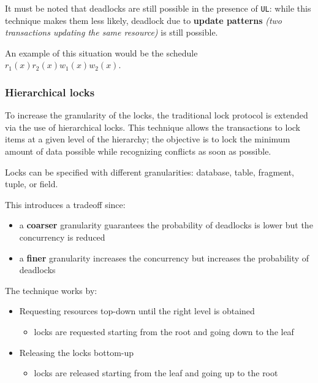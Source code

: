 \documentclass[english]{article}
\begin{document}
\bigskip
It must be noted that deadlocks are still possible in the presence of \texttt{UL}:
while this technique makes them less likely, deadlock due to \textbf{update patterns} \textit{(two transactions updating the same resource)} is still possible.

An example of this situation would be the schedule \(r_1(x) r_2(x) w_1(x) w_2(x)\).

\subsubsection{Hierarchical locks}

To increase the granularity of the locks, the traditional lock protocol is extended via the use of hierarchical locks.
This technique allows the transactions to lock items at a given level of the hierarchy;
the objective is to lock the minimum amount of data possible while recognizing conflicts as soon as possible.

\begin{minipage}{0.8\textwidth}
  \bigskip
  Locks can be specified with different granularities: database, table, fragment, tuple, or field.

  This introduces a tradeoff since:
  \begin{itemize}
    \item a \textbf{coarser} granularity guarantees the probability of deadlocks is lower but the concurrency is reduced
    \item a \textbf{finer} granularity increases the concurrency but increases the probability of deadlocks
  \end{itemize}
  \bigskip
\end{minipage}
\begin{minipage}{0.195\textwidth}
  \bigskip
  \centering
  \bigskip
\end{minipage}

\bigskip
The technique works by:

\begin{itemize}
  \item Requesting resources top-down until the right level is obtained
        \begin{itemize}[label=\(\downarrow\)]
          \item locks are requested starting from the root and going down to the leaf
        \end{itemize}
  \item Releasing the locks bottom-up
        \begin{itemize}[label=\(\uparrow\)]
          \item locks are released starting from the leaf and going up to the root
        \end{itemize}
\end{itemize}
\end{document}
